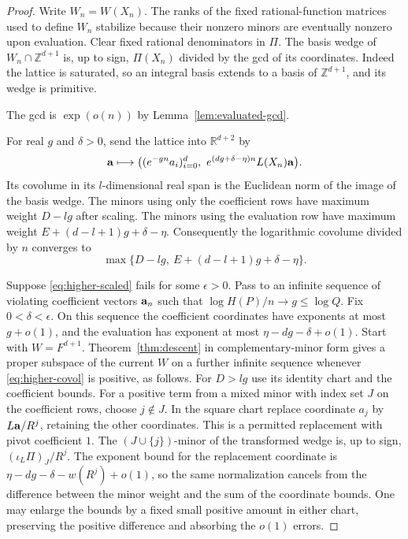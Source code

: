\documentclass[11pt,a4paper,reqno]{amsart}
\theoremstyle{definition}
\theoremstyle{remark}
\numberwithin{equation}{section}
\begin{document}
\begin{proof}
Write \(W_n=W(X_n)\). The ranks of the fixed rational-function
matrices used to define \(W_n\) stabilize because their nonzero
minors are eventually nonzero upon evaluation. Clear fixed
rational denominators in \(\Pi\). The basis wedge of
\(W_n\cap\mathbb Z^{d+1}\) is, up to sign, \(\Pi(X_n)\)
divided by the gcd of its coordinates. Indeed the lattice is
saturated, so an integral basis extends to a basis of
\(\mathbb Z^{d+1}\), and its wedge is primitive.

The gcd is \(\exp(o(n))\) by Lemma~\ref{lem:evaluated-gcd}.

For real \(g\) and \(\delta>0\), send the lattice into
\(\mathbb R^{d+2}\) by
\begin{equation}\label{eq:higher-map}
 {\bf a}\longmapsto
 \big((e^{-gn}a_i)_{i=0}^d,\ 
             e^{(dg+\delta-\eta)n}L(X_n){\bf a}\big).
\end{equation}
Its covolume in its \(l\)-dimensional real span is the
Euclidean norm of the image of the basis wedge. The minors
using only the coefficient rows have maximum weight
\(D-lg\) after scaling. The minors using the evaluation row
have maximum weight \(E+(d-l+1)g+\delta-\eta\).
Consequently the logarithmic covolume divided by \(n\)
converges to
\begin{equation}\label{eq:higher-covol}
 \max\{D-lg,\ E+(d-l+1)g+\delta-\eta\}.
\end{equation}

Suppose \eqref{eq:higher-scaled} fails for some \(\epsilon>0\).
Pass to an infinite sequence of violating coefficient vectors
\({\bf a}_n\) such that \(\log H(P)/n\to g\le\log Q\).
Fix \(0<\delta<\epsilon\). On this sequence the coefficient
coordinates have exponents at most \(g+o(1)\), and the
evaluation has exponent at most \(\eta-dg-\delta+o(1)\).
Start with \(W=F^{d+1}\). Theorem~\ref{thm:descent} in
complementary-minor form gives a proper subspace of the
current \(W\) on a further infinite sequence whenever
\eqref{eq:higher-covol} is positive, as follows. For \(D>lg\)
use its identity chart and the coefficient bounds. For a
positive term from a mixed minor with index set \(J\) on the
coefficient rows, choose \(j\notin J\). In the square chart
replace coordinate \(a_j\) by \(L{\bf a}/R^j\), retaining the
other coordinates. This is a permitted replacement with
pivot coefficient \(1\). The \((J\cup\{j\})\)-minor of
the transformed wedge is, up to sign,
\((\iota_L\Pi)_J/R^j\). The exponent bound for the
replacement coordinate is \(\eta-dg-\delta-w(R^j)+o(1)\),
so the same normalization cancels from the difference
between the minor weight and the sum of the coordinate
bounds. One may enlarge the bounds by a fixed small
positive amount in either chart, preserving the positive
difference and absorbing the \(o(1)\) errors.


\end{proof}
\end{document}
